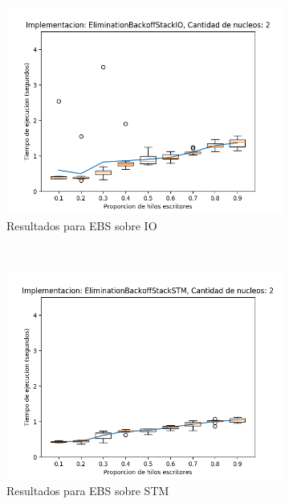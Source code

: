 \clearpage
\begin{figure}[!h]
    \centering
    \begin{subfigure}[b]{0.49\textwidth}
        \includegraphics[width=\textwidth]{images/pushPercentages/plots/expEBSIO-2}
        \caption{Resultados para EBS sobre IO}
        \label{subfig:pushPercentages-ebsio-2}
    \end{subfigure}
    ~
    \begin{subfigure}[b]{0.49\textwidth}
        \includegraphics[width=\textwidth]{images/pushPercentages/plots/expEBSSTM-2}
        \caption{Resultados para EBS sobre STM}
        \label{subfig:pushPercentages-ebsstm-2}
    \end{subfigure}
    \begin{subfigure}[b]{0.49\textwidth}

\end{subfigure}
\end{figure}
